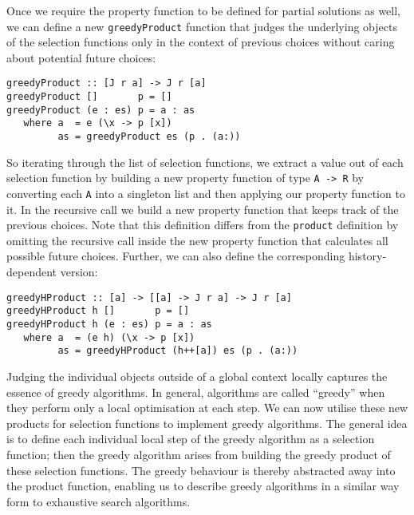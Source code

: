 \documentclass[runningheads]{llncs}
\begin{document}
Once we require the property function to be defined for partial solutions as well, we can define a new \texttt{greedyProduct} function that judges the underlying objects of the selection functions only in the context of previous choices without caring about potential future choices:
\begin{verbatim}
greedyProduct :: [J r a] -> J r [a]
greedyProduct []       p = []
greedyProduct (e : es) p = a : as
   where a  = e (\x -> p [x])
         as = greedyProduct es (p . (a:))
\end{verbatim}
So iterating through the list of selection functions, we extract a value out of each selection function by building a new property function of type \texttt{A -> R} by converting each \texttt{A} into a singleton list and then applying our property function to it. In the recursive call we build a new property function that keeps track of the previous choices. Note that this definition differs from the \texttt{product} definition by omitting the recursive call inside the new property function that calculates all possible future choices.
Further, we can also define the corresponding history-dependent version:
\begin{verbatim}
greedyHProduct :: [a] -> [[a] -> J r a] -> J r [a]
greedyHProduct h []       p = []
greedyHProduct h (e : es) p = a : as
   where a  = (e h) (\x -> p [x])
         as = greedyHProduct (h++[a]) es (p . (a:))
\end{verbatim}
Judging the individual objects outside of a global context locally captures the essence of greedy algorithms. In general, algorithms are called ``greedy'' when they perform only a local optimisation at each step. We can now utilise these new products for selection functions to implement greedy algorithms. The general idea is to define each individual local step of the greedy algorithm as a selection function; then the greedy algorithm arises from building the greedy product of these selection functions. The greedy behaviour is thereby abstracted away into the product function, enabling us to describe greedy algorithms in a similar way form to exhaustive search algorithms.
%
%
%
\end{document}
